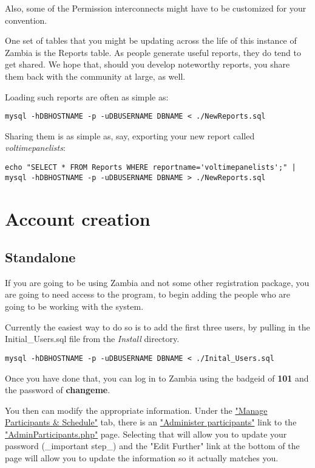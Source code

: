 \documentclass[captions=tablesignature]{scrartcl}
\begin{document}
Also, some of the Permission interconnects might have to be
customized for your convention.

One set of tables that you might be updating across the life of this
instance of Zambia is the Reports table.  As people generate useful
reports, they do tend to get shared.  We hope that, should you
develop noteworthy reports, you share them back with the community
at large, as well.

Loading such reports are often as simple as:
\begin{verbatim}
mysql -hDBHOSTNAME -p -uDBUSERNAME DBNAME < ./NewReports.sql
\end{verbatim}

Sharing them is as simple as, say, exporting your new report called
\emph{voltimepanelists}:
\begin{verbatim}
echo "SELECT * FROM Reports WHERE reportname='voltimepanelists';" |
mysql -hDBHOSTNAME -p -uDBUSERNAME DBNAME > ./NewReports.sql
\end{verbatim}
\section{Account creation}
\label{sec-7}
\subsection{Standalone}
\label{sec-7-1}

If you are going to be using Zambia and not some other registration
package, you are going to need access to the program, to begin
adding the people who are going to be working with the system.

Currently the easiest way to do so is to add the first three users,
by pulling in the Initial\_Users.sql file from the \emph{Install}
directory.

\begin{verbatim}
mysql -hDBHOSTNAME -p -uDBUSERNAME DBNAME < ./Inital_Users.sql
\end{verbatim}

Once you have done that, you can log in to Zambia using the badgeid
of \textbf{101} and the password of \textbf{changeme}.

You then can modify the appropriate information.  Under the 
\href{../webpages/StaffManageParticipants.php}{"Manage Participants \& Schedule"} tab, there is an
\href{../webpages/AdminParticipants.php}{"Administer participants"} link to the \href{../webpages/AdminParticipants.php}{"AdminParticipants.php"} page.
Selecting that will allow you to update your password 
(\_important step\_) and the "Edit Further" link at the bottom of
the page will allow you to update the information so it actually
matches you.
\end{document}
